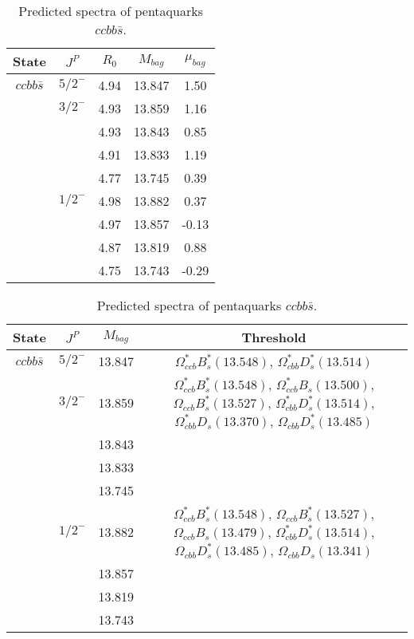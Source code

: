 \documentclass[prd,twocolumn,floatfix,nofootinbib]{revtex4}
\begin{document}
\renewcommand{\tabcolsep}{0.5cm}
\renewcommand{\arraystretch}{1.2}
\begin{table*}[!htbp]
    \caption{Predicted spectra of pentaquarks $ccbb\bar{s}$.}
    \begin{tabular}{ccccc}
        \hline\hline
        {\rm State} &$J^{P}$ &$R_{0}$ &$M_{bag}$ &$\mu_{bag}$ \\ \hline
        ${ccbb\bar{s}}$
            &${5/2}^{-}$    &4.94   &13.847 &1.50 \\
            &${3/2}^{-}$    &4.93   &13.859 &1.16 \\
            &               &4.93   &13.843 &0.85 \\
            &               &4.91   &13.833 &1.19 \\
            &               &4.77   &13.745 &0.39 \\
            &${1/2}^{-}$    &4.98   &13.882 &0.37 \\
            &               &4.97   &13.857 &-0.13 \\
            &               &4.87   &13.819 &0.88 \\
            &               &4.75   &13.743 &-0.29 \\
        \hline\hline
    \end{tabular}
\end{table*}

\renewcommand{\tabcolsep}{0.5cm}
\renewcommand{\arraystretch}{1.2}
\begin{table*}[!htbp]
    \caption{Predicted spectra of pentaquarks $ccbb\bar{s}$.}
    \begin{tabular}{cccc}
        \hline\hline
        {\rm State} &$J^{P}$ &$M_{bag}$ &Threshold \\ \hline
        ${ccbb\bar{s}}$
            &${5/2}^{-}$    &13.847 &$\Omega^{\ast}_{ccb} B^{\ast}_{s}(13.548)$, $\Omega^{\ast}_{cbb} D^{\ast}_{s}(13.514)$ \\
            &${3/2}^{-}$    &13.859 &$\Omega^{\ast}_{ccb} B^{\ast}_{s}(13.548)$, $\Omega^{\ast}_{ccb} B_{s}(13.500)$, $\Omega_{ccb} B^{\ast}_{s}(13.527)$, $\Omega^{\ast}_{cbb} D^{\ast}_{s}(13.514)$, $\Omega^{\ast}_{cbb} D_{s}(13.370)$, $\Omega_{cbb} D^{\ast}_{s}(13.485)$ \\
            &               &13.843 & \\
            &               &13.833 & \\
            &               &13.745 & \\
            &${1/2}^{-}$    &13.882 &$\Omega^{\ast}_{ccb} B^{\ast}_{s}(13.548)$, $\Omega_{ccb} B^{\ast}_{s}(13.527)$, $\Omega_{ccb} B_{s}(13.479)$, $\Omega^{\ast}_{cbb} D^{\ast}_{s}(13.514)$, $\Omega_{cbb} D^{\ast}_{s}(13.485)$, $\Omega_{cbb} D_{s}(13.341)$ \\
            &               &13.857 & \\
            &               &13.819 & \\
            &               &13.743 & \\
        \hline\hline
    \end{tabular}
\end{table*}
\end{document}
